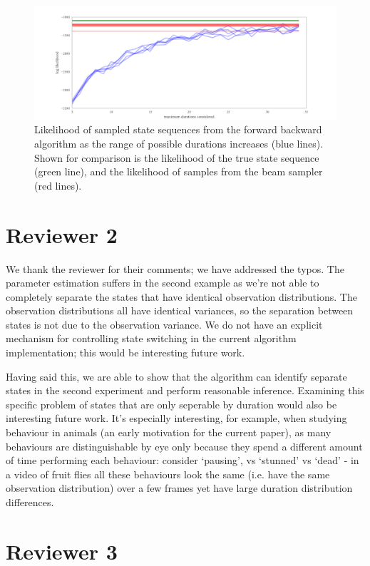 \documentclass{article}
\begin{document}
\begin{figure}
	\includegraphics[width=\textwidth]{../pic/likelihood_over_dmax.pdf}
	\caption{Likelihood of sampled state sequences from the forward backward algorithm as the range of possible durations increases (blue lines). Shown for comparison is the likelihood of the true state sequence (green line), and the likelihood of samples from the beam sampler (red lines).}
	\label{fig}
\end{figure}
 
\section*{Reviewer 2}

We thank the reviewer for their comments; we have addressed the typos. The parameter estimation suffers in the second example as we're not able to completely separate the states that have identical observation distributions. The observation distributions all have identical variances, so the separation between states is not due to the observation variance. We do not have an explicit mechanism for controlling state switching in the current algorithm implementation; this would be interesting future work.

Having said this, we are able to show that the algorithm can identify separate states in the second experiment and perform reasonable inference. Examining this specific problem of states that are only seperable by duration would also be interesting future work. It's especially interesting, for example, when studying behaviour in animals (an early motivation for the current paper), as many behaviours are distinguishable by eye only because they spend a different amount of time performing each behaviour: consider `pausing', vs `stunned' vs `dead' - in a video of fruit flies all these behaviours look the same (i.e. have the same observation distribution) over a few frames yet have large duration distribution differences. 

\section*{Reviewer 3}
\end{document}

